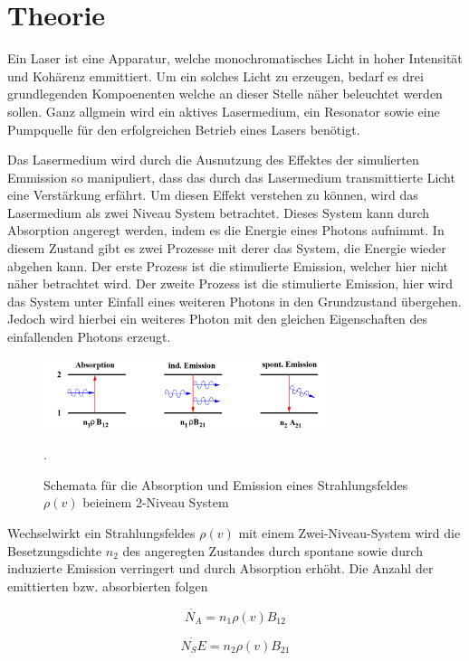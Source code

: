 \section{Theorie}
Ein Laser ist eine Apparatur, welche monochromatisches Licht in hoher Intensität und Kohärenz emmittiert. Um ein solches Licht 
zu erzeugen, bedarf es drei grundlegenden Kompoenenten welche an dieser Stelle näher beleuchtet werden sollen.
Ganz allgmein wird ein aktives Lasermedium, ein Resonator sowie eine Pumpquelle für den erfolgreichen Betrieb eines Lasers benötigt.

Das Lasermedium wird durch die Ausnutzung des Effektes der simulierten Emmission so manipuliert, dass das durch das Lasermedium transmittierte Licht
eine Verstärkung erfährt. Um diesen Effekt verstehen zu können, wird das Lasermedium als zwei Niveau System betrachtet.
Dieses System kann durch Absorption angeregt werden, indem es die Energie eines Photons aufnimmt. In diesem Zustand gibt es
zwei Prozesse mit derer das System, die Energie wieder abgehen kann. Der erste Prozess ist die stimulierte Emission, welcher hier nicht
näher betrachtet wird. Der zweite Prozess ist die stimulierte Emission, hier wird das System unter Einfall eines weiteren Photons in den Grundzustand übergehen. Jedoch wird
hierbei ein weiteres Photon mit den gleichen Eigenschaften des einfallenden Photons erzeugt.

\begin{figure}
  \centering
  \includegraphics[width=0.75\textwidth]{img/emission.png}
  \caption{Schemata für die Absorption und Emission eines Strahlungsfeldes $\rho(v)$ beieinem 2-Niveau System \cite{FP}}.
  \label{abb:emission}
\end{figure}

Wechselwirkt ein Strahlungsfeldes $\rho(v)$ mit einem Zwei-Niveau-System wird die Besetzungsdichte $n_2$ des angeregten Zustandes durch
spontane sowie durch induzierte Emission verringert und durch Absorption erhöht. Die Anzahl der emittierten bzw. absorbierten folgen

\begin{equation}
\dot{N_A} = n_1 \rho(v) B_12
\end{equation}

\begin{equation}
\dot{N_SE} = n_2 \rho(v) B_21
\end{equation}


